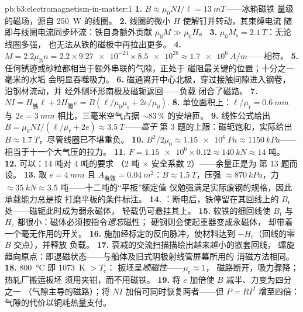 \begin{solution}{pb:b3:electromagnetism-in-matter:1}
\textbf{1.} $B \approx \mu_0NI/\ell = \qty{13}{mT}$——冰箱磁铁
量级的磁场，源自 \qty{250}{W} 的线圈。
\textbf{2.} 线圈的微小 $H$ 使解钉并转动，其束缚电流
随即与线圈电流同步环流：铁自身额外贡献
$\mu_0M \gg \mu_0H$。
\textbf{3.} $\mu_0M_{\text{s}} = \qty{2.1}{T}$：无论线圈多强，
也无法从铁的磁极中再拉出更多。
\textbf{4.} $M = 2.2\mu_{\text{B}}n = 2.2\times\num{9.27e-24}
\times\num{8.5e28} \approx \qty{1.7e6}{A/m}$——相符。
\textbf{5.} 任何锈迹或砂粒都相当于额外串联的气隙，正处于
磁阻最关键的位置；十分之一毫米的水垢
会明显吞噬吸力。
\textbf{6.} 磁通离开中心北极，穿过接触间隙进入钢卷，
沿钢材流动，并
经外侧环形南极及磁轭返回——负载
闭合了磁路。
\textbf{7.} $NI = H_{\text{铁}}\ell + 2H_{\text{隙}}e =
B(\ell/\mu_0\mu_{\text{r}} + 2e/\mu_0)$.
\textbf{8.} 单位面积上：$\ell/\mu_{\text{r}} = \qty{0.6}{mm}$
与 $2e = \qty{3}{mm}$ 相比，三毫米空气占据
$\sim83\,\%$ 的安培匝。
\textbf{9.} 线性公式给出 $B = \mu_0NI/(\ell/
\mu_{\text{r}} + 2e) \approx \qty{3.5}{T}$——\emph{高于}
第 3 题的上限：磁轭饱和，实际给出 $B \approx
\qty{1.7}{T}$，尽管线圈已不堪重负。
\textbf{10.} $B^2/2\mu_0 \approx \qty{1.15e6}{Pa} \approx
\qty{1150}{kPa}$——相当于十一个大气压的拉力。
\textbf{11.} $F = \num{1.15e6}\times0.12 \approx \qty{140}{kN}
\approx 14$ 吨。
\textbf{12.} 可以：14 吨对 4 吨的要求
（2 吨 $\times$ 安全系数 2）——余量正是为
第 13 题而设。
\textbf{13.} 取 $e = \qty{4}{mm}$ 且 $A_{\text{有效}} =
\qty{0.04}{m^2}$：$B \approx \qty{1.5}{T}$，压强
$\approx\qty{870}{kPa}$，力 $\approx\qty{35}{kN} \approx 3.5$
吨——十二吨的“平板”额定值
仅勉强满足实际废钢的规格，因此承载能力总是按
打磨平板的条件标注。
\textbf{14.} ：断电后，铁停留在其回线上的
$B_{\text{r}}$ 处——磁轭此时成为弱永磁体，
轻载仍可悬挂其上。
\textbf{15.} 软铁的细回线使 $B_{\text{r}}$ 与
$H_{\text{c}}$ 都很小：磁体必须按指令\emph{遗忘}磁性；
硬钢则会使起重器变成永磁体，
却带着一个毫无作用的开关。
\textbf{16.} 施加经标定的反向脉冲，使材料达到
$-H_{\text{c}}$（回线的零 $B$ 交点），并释放
负载。
\textbf{17.} 衰减的交流扫描描绘出越来越小的嵌套回线，
螺旋趋向原点：即退磁状态——与船体及旧式阴极射线管屏幕所用的
消磁方法相同。
\textbf{18.} \qty{800}{\celsius} 即 \qty{1073}{K} $> T_{\text{c}}$：
板坯呈\emph{顺磁性}——$\mu_{\text{r}} \approx 1$，
磁路断开，吸力骤降；热轧厂搬运板坯
须用夹钳，而不用磁铁。
\textbf{19.} 将 $e$ 加倍使 $B$ 减半、力变为四分之一
（气隙主导的磁路）；将 $NI$ 加倍可同时恢复两者——但
$P = RI^2$ 增至四倍：气隙的代价以铜耗热量支付。

\end{solution}
